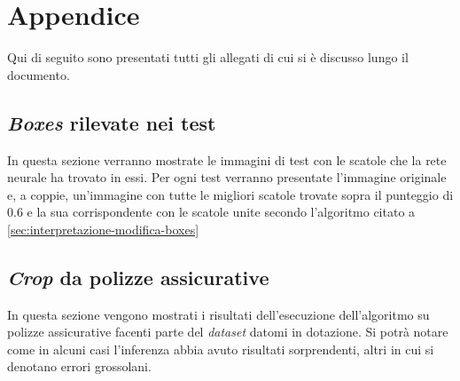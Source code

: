 
\chapter{Appendice}
Qui di seguito sono presentati tutti gli allegati di cui si è discusso lungo il documento.
\section{\textit{Boxes} rilevate nei test}
\label{sec:test-boxes}
In questa sezione verranno mostrate le immagini di test con le scatole che la rete neurale ha trovato in essi. Per ogni test verranno presentate l'immagine originale e, a coppie, un'immagine con tutte le migliori scatole trovate sopra il punteggio di $0.6$ e la sua corrispondente con le scatole unite secondo l'algoritmo citato a \ref{sec:interpretazione-modifica-boxes}








\section{\textit{Crop} da polizze assicurative}
\label{sec:crop-polizze-assicurative}
In questa sezione vengono mostrati i risultati dell'esecuzione dell'algoritmo su polizze assicurative facenti parte del \textit{dataset} datomi in dotazione. Si potrà notare come in alcuni casi l'inferenza abbia avuto risultati sorprendenti, altri in cui si denotano errori grossolani.








